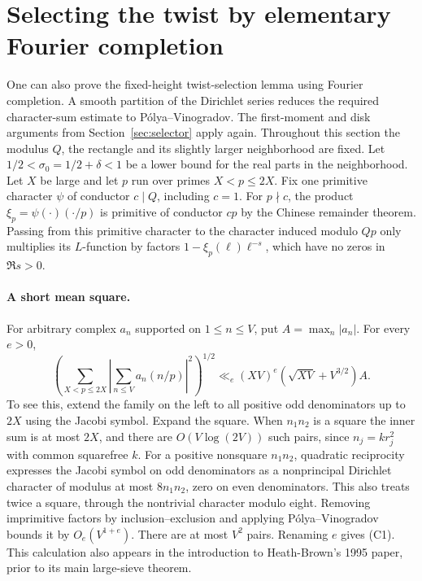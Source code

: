 \section{Selecting the twist by elementary Fourier completion}\label{sec:fourier}
One can also prove the fixed-height twist-selection lemma using Fourier completion. A smooth partition of the Dirichlet series reduces the required character-sum estimate to P\'olya--Vinogradov. The first-moment and disk arguments from Section~\ref{sec:selector} apply again. Throughout this section the modulus $Q$, the rectangle and its slightly larger neighborhood are fixed. Let $1/2<\sigma_0=1/2+\delta<1$ be a lower bound for the real parts in the neighborhood. Let $X$ be large and let $p$ run over primes $X<p\le 2X$. Fix one primitive character $\psi$ of conductor $c\mid Q$, including $c=1$. For $p\nmid c$, the product $\xi_p=\psi(\cdot)(\cdot/p)$ is primitive of conductor $cp$ by the Chinese remainder theorem. Passing from this primitive character to the character induced modulo $Qp$ only multiplies its $L$-function by factors $1-\xi_p(\ell)\ell^{-s}$, which have no zeros in $\Re s>0$.

\paragraph{A short mean square.} For arbitrary complex $a_n$ supported on $1\le n\le V$, put $A=\max_n|a_n|$. For every $e>0$,
\begin{equation}
 \left(\sum_{X<p\le2X}\left|\sum_{n\le V}a_n(n/p)\right|^2\right)^{1/2}
 \ll_e (XV)^e\left(\sqrt{XV}+V^{3/2}\right)A.\tag{C1}
\end{equation}
To see this, extend the family on the left to all positive odd denominators up to $2X$ using the Jacobi symbol. Expand the square. When $n_1n_2$ is a square the inner sum is at most $2X$, and there are $O(V\log(2V))$ such pairs, since $n_j=kr_j^2$ with common squarefree $k$. For a positive nonsquare $n_1n_2$, quadratic reciprocity expresses the Jacobi symbol on odd denominators as a nonprincipal Dirichlet character of modulus at most $8n_1n_2$, zero on even denominators. This also treats twice a square, through the nontrivial character modulo eight. Removing imprimitive factors by inclusion--exclusion and applying P\'olya--Vinogradov bounds it by $O_e(V^{1+e})$. There are at most $V^2$ pairs. Renaming $e$ gives (C1). This calculation also appears in the introduction to Heath-Brown's 1995 paper, prior to its main large-sieve theorem.


